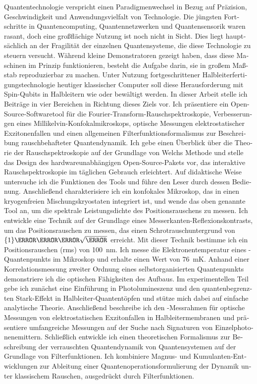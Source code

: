 \begin{german}
    Quantentechnologie verspricht einen Paradigmenwechsel in Bezug auf Präzision, Geschwindigkeit und Anwendungsvielfalt von Technologie.
    Die jüngsten Fortschritte in Quantencomputing, Quantennetzwerken und Quantensensorik waren rasant, doch eine großflächige Nutzung ist noch nicht in Sicht.
    Dies liegt hauptsächlich an der Fragilität der einzelnen Quantensysteme, die diese Technologie zu steuern versucht.
    Während kleine Demonstratoren gezeigt haben, dass diese Maschinen im Prinzip funktionieren, besteht die Aufgabe darin, sie in großem Maßstab reproduzierbar zu machen.
    Unter Nutzung fortgeschrittener Halbleiterfertigungstechnologie heutiger klassischer Computer soll diese Herausforderung mit Spin-Qubits in Halbleitern wie  oder  bewältigt werden.
    In dieser Arbeit stelle ich Beiträge in vier Bereichen in Richtung dieses Ziels vor.
    Ich präsentiere ein Open-Source-Softwaretool für die Fourier-Transform-Rauschspektroskopie, Verbesserungen eines Millikelvin-Konfokalmikroskops, optische Messungen elektrostatischer Exzitonenfallen und einen allgemeinen Filterfunktionsformalismus zur Beschreibung rauschbehafteter Quantendynamik.
    Ich gebe einen Überblick über die Theorie der Rauschspektroskopie auf der Grundlage von Welchs Methode und stelle das Design des hardwareunabhängigen Open-Source-Pakets \pyspeck vor, das interaktive Rauschspektroskopie im täglichen Gebrauch erleichtert.
    Auf didaktische Weise untersuche ich die Funktionen des Tools und führe den Leser durch dessen Bedienung.
    Anschließend charakterisiere ich ein konfokales Mikroskop, das in einen kryogenfreien Mischungskryostaten integriert ist, und wende das oben genannte Tool an, um die spektrale Leistungsdichte des Positionsrauschens zu messen.
    Ich entwickle eine Technik auf der Grundlage eines Messerkanten-Reflexionskontrasts, um das Positionsrauschen zu messen, das einen Schrotrauschuntergrund von $\qty{1}{\nano\meter\per\sqrt{\hertz}}$ erreicht.
    Mit dieser Technik bestimme ich ein Positionsrauschen (\acrshort{rms}) von \qty{100}{\nano\meter}.
    Ich messe die Elektronentemperatur eines -Quantenpunkts im Mikroskop und erhalte einen Wert von \qty{76}{\milli\kelvin}.
    Anhand einer Korrelationsmessung zweiter Ordnung eines selbstorganisierten Quantenpunkts demonstriere ich die optischen Fähigkeiten des Aufbaus.
    Im experimentellen Teil gebe ich zunächst eine Einführung in Photolumineszenz und den quantenbegrenzten Stark-Effekt in Halbleiter-Quantentöpfen und stütze mich dabei auf einfache analytische Theorie.
    Anschließend beschreibe ich den \mjolnir-Messrahmen für optische Messungen von elektrostatischen Exzitonfallen in Halbleitermembranen und präsentiere umfangreiche Messungen auf der Suche nach Signaturen von Einzelphotonenemittern.
    Schließlich entwickle ich einen theoretischen Formalismus zur Beschreibung der verrauschten Quantendynamik von Quantensystemen auf der Grundlage von Filterfunktionen.
    Ich kombiniere Magnus- und Kumulanten-Entwicklungen zur Ableitung einer Quantenoperationsformulierung der Dynamik unter klassischem Rauschen, ausgedrückt durch Filterfunktionen.
\end{german}
